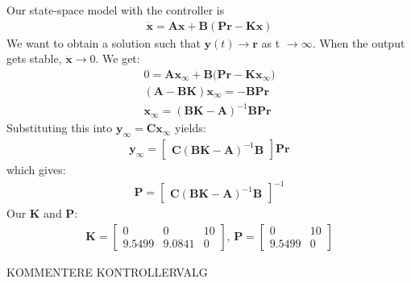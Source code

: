 Our state-space model with the controller is
\begin{gather*}
     \mathbf{\dot{x}} = \mathbf{Ax} + \mathbf{B}(\mathbf{Pr} - \mathbf{Kx})
\end{gather*}
We want to obtain a solution such that  \( \mathbf{y}(t) \rightarrow \mathbf{r} \)  as t \(\rightarrow \infty\). When the output gets stable,  
\(\mathbf{\dot{x}} \rightarrow 0\). We get:
\begin{gather*}
    0 = \mathbf{Ax_\infty} + \mathbf{B}(\mathbf{Pr} - \mathbf{Kx_\infty)} \\
    (\mathbf{A} - \mathbf{BK})\mathbf{x_\infty} = -\mathbf{BPr} \\
    \mathbf{x_\infty} = (\mathbf{BK} - \mathbf{A})^{-1}
    \mathbf{BPr}
\end{gather*}
Substituting this into \(\mathbf{y_\infty} = \mathbf{Cx_\infty}\) yields:      
\begin{gather*}
    \mathbf{y_\infty} = 
    \begin{bmatrix} \mathbf{C}(\mathbf{BK} - \mathbf{A})^{-1} \mathbf{B}\end{bmatrix}\mathbf{Pr}
\end{gather*}
which gives:
\begin{gather*}
    \mathbf{P} = 
    \begin{bmatrix}\mathbf{C}(\mathbf{BK} - \mathbf{A})^{-1}\mathbf{B}\end{bmatrix}^{-1}
\end{gather*}
Our \textbf{K} and \textbf{P}:
\begin{gather*}
    \mathbf{K} = \begin{bmatrix}
    0 & 0 & 10 \\
    9.5499 & 9.0841 & 0 \end{bmatrix}\textbf{, } \mathbf{P} =
    \begin{bmatrix} 0 & 10 \\ 9.5499 & 0 \end{bmatrix}
\end{gather*}

KOMMENTERE KONTROLLERVALG

